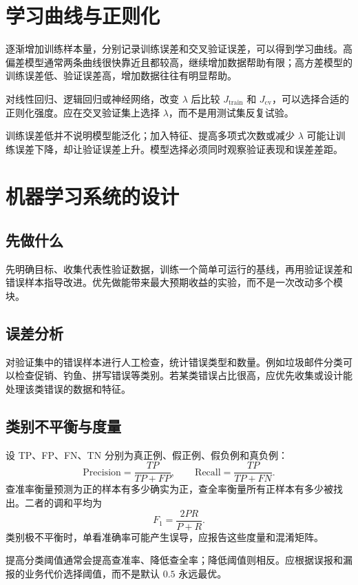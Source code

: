 \section{学习曲线与正则化}
\begin{definitionbox}[学习曲线]
逐渐增加训练样本量，分别记录训练误差和交叉验证误差，可以得到学习曲线。高偏差模型通常两条曲线很快靠近且都较高，继续增加数据帮助有限；高方差模型的训练误差低、验证误差高，增加数据往往有明显帮助。
\end{definitionbox}
\begin{tipbox}[正则化与偏差方差]
对线性回归、逻辑回归或神经网络，改变 $\lambda$ 后比较 $J_{\mathrm{train}}$ 和 $J_{\mathrm{cv}}$，可以选择合适的正则化强度。应在交叉验证集上选择 $\lambda$，而不是用测试集反复试验。
\end{tipbox}
\begin{mistakebox}[不要只看训练误差]
训练误差低并不说明模型能泛化；加入特征、提高多项式次数或减少 $\lambda$ 可能让训练误差下降，却让验证误差上升。模型选择必须同时观察验证表现和误差差距。
\end{mistakebox}

\section{机器学习系统的设计}
\subsection{先做什么}
\begin{keybox}[先建立可测量的基线]
先明确目标、收集代表性验证数据，训练一个简单可运行的基线，再用验证误差和错误样本指导改进。优先做能带来最大预期收益的实验，而不是一次改动多个模块。
\end{keybox}
\subsection{误差分析}
\begin{definitionbox}[误差分析]
对验证集中的错误样本进行人工检查，统计错误类型和数量。例如垃圾邮件分类可以检查促销、钓鱼、拼写错误等类别。若某类错误占比很高，应优先收集或设计能处理该类错误的数据和特征。
\end{definitionbox}
\subsection{类别不平衡与度量}
\begin{definitionbox}
设 TP、FP、FN、TN 分别为真正例、假正例、假负例和真负例：
\[
\mathrm{Precision}=\frac{TP}{TP+FP},\qquad
\mathrm{Recall}=\frac{TP}{TP+FN}.
\]
查准率衡量预测为正的样本有多少确实为正，查全率衡量所有正样本有多少被找出。二者的调和平均为
\[
F_1=\frac{2PR}{P+R}.
\]
类别极不平衡时，单看准确率可能产生误导，应报告这些度量和混淆矩阵。
\end{definitionbox}
\begin{tipbox}[阈值权衡]
提高分类阈值通常会提高查准率、降低查全率；降低阈值则相反。应根据误报和漏报的业务代价选择阈值，而不是默认 $0.5$ 永远最优。
\end{tipbox}
